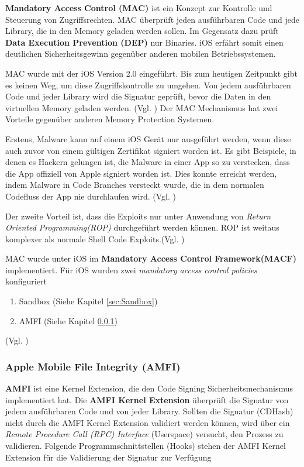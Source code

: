  \textbf{Mandatory Access Control (MAC)} ist ein Konzept zur Kontrolle und Steuerung von Zugriffsrechten. MAC überprüft jeden ausführbaren Code und jede Library, die in den Memory geladen werden sollen. Im Gegensatz dazu prüft \textbf{Data Execution Prevention (DEP)} nur Binaries. iOS erfährt somit einen deutlichen Sicherheitsgewinn gegenüber anderen mobilen Betriebssystemen. \par 
 MAC wurde mit der iOS Version 2.0 eingeführt. Bis zum heutigen Zeitpunkt gibt es keinen Weg, um diese Zugriffskontrolle zu umgehen. Von jedem ausführbaren Code und jeder Library wird die Signatur geprüft, bevor die Daten in den virtuellen Memory geladen werden. (Vgl. \cite{iOSSec[5], Hacking[1]})
Der MAC Mechanismus hat zwei Vorteile gegenüber anderen Memory Protection Systemen. \par 
Erstens, Malware kann auf einem iOS Gerät nur ausgeführt werden, wenn diese auch zuvor von einem gültigen Zertifikat signiert worden ist. Es gibt Beispiele, in denen es Hackern gelungen ist, die Malware in einer App so zu verstecken, dass die App offiziell von Apple signiert worden ist. Dies konnte erreicht werden, indem Malware in Code Branches versteckt wurde, die in dem normalen Codefluss der App nie durchlaufen wird. (Vgl. \cite{iOSSec[5], Hacking[1]}) \par
 Der zweite Vorteil ist, dass die Exploits nur unter Anwendung von \textit{ \glqq Return Oriented Programming(ROP)\grqq{} } durchgeführt werden können. ROP ist weitaus komplexer als normale Shell Code Exploits.(Vgl. \cite{Architecture[1], Architecture[2], Architecture[3], ROP[1], ROP[2], iOSSec[5], Hacking[1]})

MAC wurde unter iOS im \textbf{Mandatory Access Control Framework(MACF)} implementiert. Für iOS wurden zwei \textit{\glqq mandatory access control policies\grqq{}} konfiguriert
\begin{enumerate}
   \item Sandbox (Siehe Kapitel \ref{sec:Sandbox})
   \item AMFI (Siehe Kapitel \ref{sec:AMFI})
\end{enumerate}
(Vgl. \cite{iOSSec[5], Hacking[1]})

\subsubsection{Apple Mobile File Integrity (AMFI)}
\label{sec:AMFI}
\textbf{AMFI } ist eine Kernel Extension, die den Code Signing Sicherheitsmechanismus implementiert hat. Die \textbf{AMFI Kernel Extension} überprüft die Signatur von jedem ausführbaren Code und von jeder Library. Sollten die Signatur (CDHash) nicht durch die AMFI Kernel Extension validiert werden können, wird über ein \textit{\glqq Remote Procedure Call (RPC) Interface\grqq{}} (Userspace) versucht, den Prozess zu validieren. Folgende Programmschnittstellen (Hooks) stehen der AMFI Kernel Extension für die Validierung der Signatur zur Verfügung

